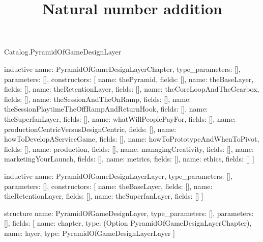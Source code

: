\begin{lexlean}{Catalog.PyramidOfGameDesignLayer}
\title{Natural number addition}
\begin{semanticmodule}
inductive{
  name: PyramidOfGameDesignLayerChapter,
  type_parameters: [],
  parameters: [],
  constructors: [
    {name: thePyramid, fields: []},
    {name: theBaseLayer, fields: []},
    {name: theRetentionLayer, fields: []},
    {name: theCoreLoopAndTheGearbox, fields: []},
    {name: theSessionAndTheOnRamp, fields: []},
    {name: theSessionPlaytimeTheOffRampAndReturnHook, fields: []},
    {name: theSuperfanLayer, fields: []},
    {name: whatWillPeoplePayFor, fields: []},
    {name: productionCentricVersusDesignCentric, fields: []},
    {name: howToDevelopAServiceGame, fields: []},
    {name: howToPrototypeAndWhenToPivot, fields: []},
    {name: production, fields: []},
    {name: managingCreativity, fields: []},
    {name: marketingYourLaunch, fields: []},
    {name: metrics, fields: []},
    {name: ethics, fields: []}
  ]
}

inductive{
  name: PyramidOfGameDesignLayerLayer,
  type_parameters: [],
  parameters: [],
  constructors: [
    {name: theBaseLayer, fields: []},
    {name: theRetentionLayer, fields: []},
    {name: theSuperfanLayer, fields: []}
  ]
}

structure{
  name: PyramidOfGameDesignLayer,
  type_parameters: [],
  parameters: [],
  fields: [
    {name: chapter, type: (Option PyramidOfGameDesignLayerChapter)},
    {name: layer, type: PyramidOfGameDesignLayerLayer}
  ]
}
\end{semanticmodule}
\end{lexlean}
